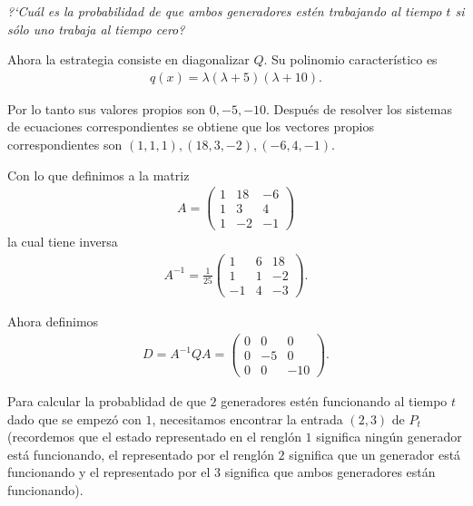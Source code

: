 \emph{
    ?`Cu\'al es la probabilidad de que ambos generadores est\'en trabajando al tiempo $t$ 
    si s\'olo uno trabaja al tiempo cero?\pn
}

\afterstatement\pn

Ahora la estrategia consiste en diagonalizar $Q$. 
Su polinomio característico es
\begin{align}
        q(x) =  \lambda (\lambda + 5) (\lambda + 10).
\end{align}

Por lo tanto sus valores propios son $0, -5, -10$. Después de resolver los
sistemas de ecuaciones correspondientes se obtiene que los vectores propios correspondientes son
$(1,1,1), (18, 3, -2), (-6, 4, -1)$.

Con lo que definimos a la matriz
\begin{align}
     A      =
                \begin{pmatrix}
                    1   &   18  &   -6      \\
                    1   &   3   &   4       \\
                    1   &   -2  &   -1
                \end{pmatrix}   
\end{align}
la cual tiene inversa
\begin{align}
     A^{-1}     =   \frac{1}{25}
                    \begin{pmatrix}
                        1       &   6   &   18      \\
                        1       &   1   &   -2      \\
                        -1      &   4   &   -3
                    \end{pmatrix}.   
\end{align}

Ahora definimos
\begin{align}
    D = A^{-1} Q A  =
                        \begin{pmatrix}
                            0   &   0   &   0      \\
                            0   &   -5  &   0      \\
                            0   &   0   &   -10
                        \end{pmatrix}.
\end{align}

Para calcular la probablidad de que $2$ generadores estén funcionando al tiempo $t$ dado que se empezó con $1$, necesitamos 
encontrar la entrada $(2,3)$ de $P_t$ (recordemos que el estado representado en el renglón $1$ significa ningún generador 
está funcionando, el representado por el renglón $2$ significa que un generador está funcionando y el representado por el 
$3$ significa que ambos generadores están funcionando).\pn
  
